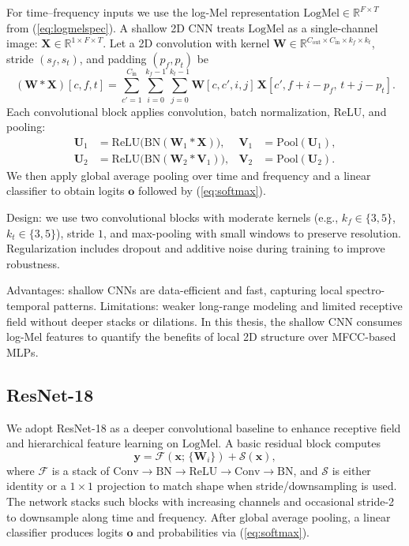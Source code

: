 For time–frequency inputs we use the log-Mel representation \(\mathrm{LogMel} \in \mathbb{R}^{F\times T}\) from (\ref{eq:logmelspec}). A shallow 2D CNN treats \(\mathrm{LogMel}\) as a single-channel image: \(\mathbf{X} \in \mathbb{R}^{1\times F\times T}\). Let a 2D convolution with kernel \(\mathbf{W} \in \mathbb{R}^{C_{\text{out}} \times C_{\text{in}} \times k_f \times k_t}\), stride \((s_f,s_t)\), and padding \((p_f,p_t)\) be
\begin{equation}\label{eq:cnnconv}
(\mathbf{W} * \mathbf{X})[c,f,t] = \sum_{c'=1}^{C_{\text{in}}} \sum_{i=0}^{k_f-1} \sum_{j=0}^{k_t-1} \mathbf{W}[c,c',i,j] \, \mathbf{X}[c', f+i-p_f,\, t+j-p_t].
\end{equation}
Each convolutional block applies convolution, batch normalization, ReLU, and pooling:
\begin{align}
\mathbf{U}_1 &= \mathrm{ReLU}\big(\mathrm{BN}(\mathbf{W}_1 * \mathbf{X})\big), & \mathbf{V}_1 &= \mathrm{Pool}(\mathbf{U}_1),\\
\mathbf{U}_2 &= \mathrm{ReLU}\big(\mathrm{BN}(\mathbf{W}_2 * \mathbf{V}_1)\big), & \mathbf{V}_2 &= \mathrm{Pool}(\mathbf{U}_2).
\end{align}
We then apply global average pooling over time and frequency and a linear classifier to obtain logits \(\mathbf{o}\) followed by (\ref{eq:softmax}).

Design: we use two convolutional blocks with moderate kernels (e.g., \(k_f\in\{3,5\}\), \(k_t\in\{3,5\}\)), stride \(1\), and max-pooling with small windows to preserve resolution. Regularization includes dropout and additive noise during training to improve robustness.

Advantages: shallow CNNs are data-efficient and fast, capturing local spectro-temporal patterns. Limitations: weaker long-range modeling and limited receptive field without deeper stacks or dilations. In this thesis, the shallow CNN consumes log-Mel features to quantify the benefits of local 2D structure over MFCC-based MLPs.

\subsection{ResNet-18}

We adopt ResNet-18 as a deeper convolutional baseline to enhance receptive field and hierarchical feature learning on \(\mathrm{LogMel}\). A basic residual block computes
\begin{equation}\label{eq:residual}
\mathbf{y} = \mathcal{F}(\mathbf{x};\, \{\mathbf{W}_i\}) + \mathcal{S}(\mathbf{x}),
\end{equation}
where \(\mathcal{F}\) is a stack of \(\mathrm{Conv}{\to}\mathrm{BN}{\to}\mathrm{ReLU}{\to}\mathrm{Conv}{\to}\mathrm{BN}\), and \(\mathcal{S}\) is either identity or a \(1\!\times\!1\) projection to match shape when stride/downsampling is used. The network stacks such blocks with increasing channels and occasional stride-2 to downsample along time and frequency. After global average pooling, a linear classifier produces logits \(\mathbf{o}\) and probabilities via (\ref{eq:softmax}).

